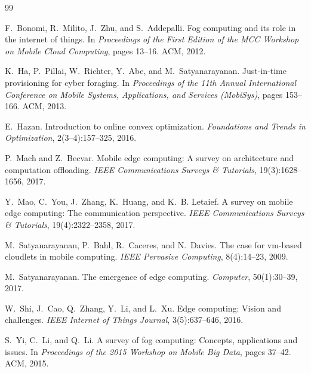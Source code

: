 \begin{thebibliography}{99}

F.~Bonomi, R.~Milito, J.~Zhu, and S.~Addepalli.
\newblock Fog computing and its role in the internet of things.
\newblock In \emph{Proceedings of the First Edition of the MCC Workshop on Mobile
  Cloud Computing}, pages 13--16. ACM, 2012.

K.~Ha, P.~Pillai, W.~Richter, Y.~Abe, and M.~Satyanarayanan.
\newblock Just-in-time provisioning for cyber foraging.
\newblock In \emph{Proceedings of the 11th Annual International Conference on
  Mobile Systems, Applications, and Services (MobiSys)}, pages 153--166. ACM, 2013.

E.~Hazan.
\newblock Introduction to online convex optimization.
\emph{Foundations and Trends in Optimization}, 2(3--4):157--325, 2016.

P.~Mach and Z.~Becvar.
\newblock Mobile edge computing: A survey on architecture and computation
  offloading.
\emph{IEEE Communications Surveys \& Tutorials}, 19(3):1628--1656, 2017.

Y.~Mao, C.~You, J.~Zhang, K.~Huang, and K.~B. Letaief.
\newblock A survey on mobile edge computing: The communication perspective.
\emph{IEEE Communications Surveys \& Tutorials}, 19(4):2322--2358, 2017.

M.~Satyanarayanan, P.~Bahl, R.~Caceres, and N.~Davies.
\newblock The case for vm-based cloudlets in mobile computing.
\emph{IEEE Pervasive Computing}, 8(4):14--23, 2009.

M.~Satyanarayanan.
\newblock The emergence of edge computing.
\emph{Computer}, 50(1):30--39, 2017.

W.~Shi, J.~Cao, Q.~Zhang, Y.~Li, and L.~Xu.
\newblock Edge computing: Vision and challenges.
\emph{IEEE Internet of Things Journal}, 3(5):637--646, 2016.

S.~Yi, C.~Li, and Q.~Li.
\newblock A survey of fog computing: Concepts, applications and issues.
\newblock In \emph{Proceedings of the 2015 Workshop on Mobile Big Data},
  pages 37--42. ACM, 2015.

\end{thebibliography}
